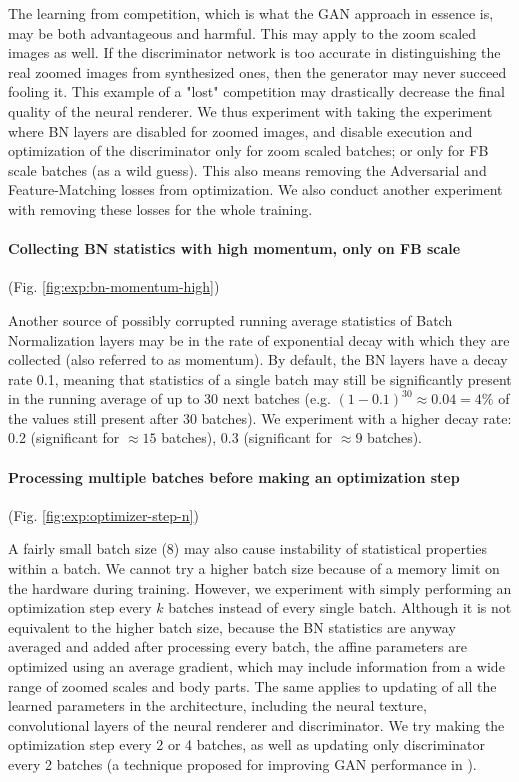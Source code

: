 The learning from competition, which is what the GAN approach in essence is, may be both advantageous and harmful. This may apply to the zoom scaled images as well. If the discriminator network is too accurate in distinguishing the real zoomed images from synthesized ones, then the generator may never succeed fooling it. This example of a "lost" competition may drastically decrease the final quality of the neural renderer. We thus experiment with taking the experiment where BN layers are disabled for zoomed images, and disable execution and optimization of the discriminator only for zoom scaled batches; or only for FB scale batches (as a wild guess). This also means removing the Adversarial and Feature-Matching losses from optimization. We also conduct another experiment with removing these losses for the whole training.

\vspace{-15pt}\paragraph{Collecting BN statistics with high momentum, only on FB scale}(Fig. \ref{fig:exp:bn-momentum-high})\mbox{}\nopagebreak

Another source of possibly corrupted running average statistics of Batch Normalization layers may be in the rate of exponential decay with which they are collected (also referred to as momentum). By default, the BN layers have a decay rate 0.1, meaning that statistics of a single batch may still be significantly present in the running average of up to 30 next batches (e.g. $(1-0.1)^{30} \approx 0.04 = 4\%$ of the values still present after 30 batches). We experiment with a higher decay rate: 0.2 (significant for $\approx 15$ batches), 0.3 (significant for $\approx 9$ batches).

\vspace{-15pt}\paragraph{Processing multiple batches before making an optimization step}(Fig. \ref{fig:exp:optimizer-step-n})\mbox{}\nopagebreak

A fairly small batch size (8) may also cause instability of statistical properties within a batch. We cannot try a higher batch size because of a memory limit on the hardware during training. However, we experiment with simply performing an optimization step every $k$ batches instead of every single batch. Although it is not equivalent to the higher batch size, because the BN statistics are anyway averaged and added after processing every batch, the affine parameters are optimized using an average gradient, which may include information from a wide range of zoomed scales and body parts. The same applies to updating of all the learned parameters in the architecture, including the neural texture, convolutional layers of the neural renderer and discriminator. We try making the optimization step every 2 or 4 batches, as well as updating only discriminator every 2 batches (a technique proposed for improving GAN performance in \cite{dnn:gan14}).

